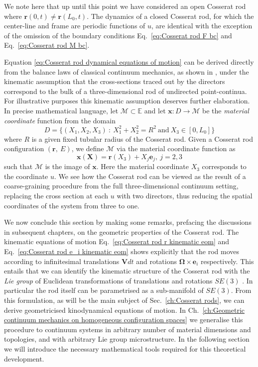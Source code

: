We note here that up until this point we have considered an open Cosserat rod where $\mathbf{r}(0,t) \neq \mathbf{r}(L_0,t)$. The dynamics of a closed Cosserat rod, for which the center-line and frame are periodic functions of $u$, are identical with the exception of the omission of the boundary conditions Eq.~\ref{eq:Cosserat rod F bc} and Eq.~\ref{eq:Cosserat rod M bc}.

Equation \ref{eq:Cosserat rod dynamical equations of motion} can be derived directly from the balance laws of classical continuum mechanics, as shown in \citep{parkerDerivationNonlinearRod1984, rubinCosseratRods2000}, under the kinematic assumption that the cross-sections traced out by the directors correspond to the bulk of a three-dimensional rod of undirected point-continua. For illustrative purposes this kinematic assumption deserves further elaboration. In precise mathematical language, let $\mathcal{M} \subset \mathbb{E}$ and let $\mathbf{x} : D \to \mathcal{M}$ be the \textit{material coordinate} function from the domain
\begin{equation}
D = \{ (X_1, X_2, X_3)\ :\ X_1^2 + X_2^2 = R^2\ \text{and}\ X_3 \in [0,L_0]  \}
\end{equation}
where $R$ is a given fixed tubular radius of the Cosserat rod. Given a Cosserat rod configuration $(\mathbf{r},\ E)$, we define $\mathcal{M}$ via the material coordinate function as
\begin{equation}
\mathbf{x}(\mathbf{X}) = \mathbf{r}(X_3) + X_j \mathbf{e}_j,\ j=2,3
\end{equation}
such that $\mathcal{M}$ is the image of $\mathbf{x}$. Here the material coordinate $X_3$ corresponds to the coordinate $u$. We see how the Cosserat rod can be viewed as the result of a coarse-graining procedure from the full three-dimensional continuum setting, replacing the cross section at each $u$ with two directors, thus reducing the spatial coordinates of the system from three to one.

We now conclude this section by making some remarks, prefacing the discussions in subsequent chapters, on the geometric properties of the Cosserat rod. The kinematic equations of motion Eq.~\ref{eq:Cosserat rod r kinematic eom} and Eq.~\ref{eq:Cosserat rod e_i kinematic eom} shows explicitly that the rod moves according to infinitesimal translations $\mathbf{V}dt$ and rotations $\boldsymbol{\Omega} \times \mathbf{e}_i$ respectively. This entails that we can identify the kinematic structure of the Cosserat rod with the \textit{Lie group} of Euclidean transformations of translations and rotations $SE(3)$ \citep{simoGeometricallyexactRodModel1991, simoThreedimensionalFinitestrainRod1986}. In particular the rod itself can be parametrised as a sub-manifold of $SE(3)$. From this formulation, as will be the main subject of Sec.~\ref{ch:Cosserat rods}, we can derive geometricised kinodynamical equations of motion. In Ch.~\ref{ch:Geometric continuum mechanics on homogeneous configuration spaces} we generalise this procedure to continuum systems in arbitrary number of material dimensions and topologies, and with arbitrary Lie group microstructure. In the following section we will introduce the necessary mathematical tools required for this theoretical development.

